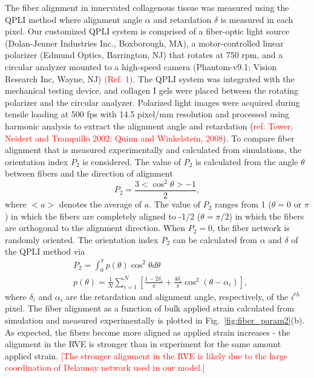 \documentclass[10pt]{asme2ej}
\begin{document}
The fiber alignment in innervated collagenous tissue was measured using the QPLI method \cite{Quinn:2009bf} where alignment angle $\alpha$ and retardation $\delta$ is measured in each pixel. Our customized QPLI system is comprised of a fiber-optic light source (Dolan-Jenner Industries Inc., Boxborough, MA), a motor-controlled linear polarizer (Edmund Optics, Barrington, NJ) that rotates at 750 rpm, and a circular analyzer mounted to a high-speed camera (Phantom-v9.1; Vision Research Inc, Wayne, NJ) \textcolor{red}{(Ref. 1)}. The QPLI system was integrated with the mechanical testing device, and collagen I gels were placed between the rotating polarizer and the circular analyzer. Polarized light images were acquired during tensile loading at 500 fps with 14.5 pixel/mm resolution and processed using harmonic analysis to extract the alignment angle and retardation (\textcolor{red}{ref: Tower, Neidert and Tranquillo 2002; Quinn and Winkelstein, 2008}).  To compare fiber alignment that is measured experimentally and calculated from simulations, the orientation index $P_2$ is considered. The value of $P_2$ is calculated from the angle $\theta$ between fibers and the direction of alignment
%
\begin{equation}
P_2 = \frac{3 <\cos^2\theta> - 1}{2},
\label{eq:P2_simulation}
\end{equation}
%
where $<a>$ denotes the average of $a$. The value of $P_2$ ranges from 1 ($\theta=0$ or $\pi$) in which the fibers are completely aligned to -1/2 ($\theta=\pi/2$) in which the fibers are orthogonal to the alignment direction. When $P_2=0$, the fiber network is randomly oriented. The orientation index $P_2$ can be calculated from $\alpha$ and $\delta$ of the QPLI method via
%
\begin{align}
&P_2 = \int_0^{\pi} p(\theta) \cos^2\theta d\theta \nonumber\\
&p(\theta) = \frac{1}{N} \sum_{i=1}^N \left[ \frac{1-2\delta_i}{\pi} + \frac{4 \delta_i}{\pi}\cos^2(\theta - \alpha_i)\right],
\label{eq:P2_experiment}
\end{align}
%
where $\delta_i$ and $\alpha_i$ are the retardation and alignment angle, respectively, of the $i^{th}$ pixel. The fiber alignment as a function of bulk applied strain calculated from simulation and measured experimentally is plotted in Fig.\ \ref{fig:fiber_param2}(b). As expected, the fibers become more aligned as applied strain increases - the alignment in the RVE is stronger than in experiment for the same amount applied strain. \textcolor{red}{[The stronger alignment in the RVE is likely due to the large coordination of Delaunay network used in our model.]}
\end{document}
